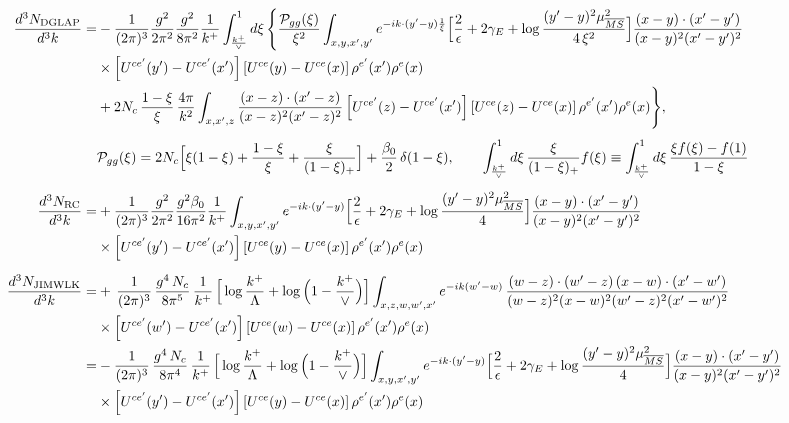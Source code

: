 \documentclass[9pt]{article}
\numberwithin{equation}{section}
\begin{document}
\begin{align}
\frac{d^{3}N_{\rm DGLAP}}{d^{3}k}= &-\frac{1}{(2\pi)^{3}}\frac{g^{2}}{2\pi^{2}}\frac{g^{2}}{8\pi^{2}}\frac{1}{k^{+}}\int_{\frac{k^{+}}{\vee}}^{1}d\xi\,\Bigg\{\frac{\mathcal P_{gg}(\xi)}{\xi^{2}}\int_{x,y,x',y'}e^{-ik\cdot(y'-y)\frac{1}{\xi}}\Big[\frac{2}{\epsilon}+2\gamma_{E}+\log\frac{(y'-y)^{2}\mu^{2}_{\overline{MS}}}{4\,\xi^{2}}\Big]\frac{(x-y)\cdot(x'-y')}{(x-y)^{2}(x'-y')^{2}}\notag\\
&\times\left[U^{ce'}(y') - U^{ce'}(x')\right]\left[U^{ce}(y) - U^{ce}(x)\right]\rho^{e'}(x')\rho^{e}(x)\notag\\
&+2N_{c}\,\frac{1-\xi}{\xi}\,\frac{4\pi}{k^{2}}\int_{x,x',z}\frac{(x-z)\cdot(x'-z)}{(x-z)^{2}(x'-z)^{2}}\left[U^{ce'}(z) - U^{ce'}(x')\right]\left[U^{ce}(z) - U^{ce}(x)\right]\rho^{e'}(x')\rho^{e}(x)\Bigg\},\\[4pt]
&\mathcal P_{gg}(\xi)=2N_{c}\Big[\xi(1-\xi)+\frac{1-\xi}{\xi}+\frac{\xi}{(1-\xi)_{+}}\Big]+\frac{\beta_{0}}{2}\,\delta(1-\xi),\qquad
\int_{\frac{k^{+}}{\vee}}^{1}d\xi\,\frac{\xi}{(1-\xi)_{+}}f(\xi)\equiv\int_{\frac{k^{+}}{\vee}}^{1}d\xi\,\frac{\xi f(\xi)-f(1)}{1-\xi}\notag\\[6pt]
\frac{d^{3}N_{\rm RC}}{d^{3}k}= & +\frac{1}{(2\pi)^{3}}\frac{g^{2}}{2\pi^{2}}\frac{g^{2}\beta_{0}}{16\pi^{2}}\frac{1}{k^{+}}\int_{x,y,x',y'}e^{-ik\cdot(y'-y)}\Big[\frac{2}{\epsilon}+2\gamma_{E}+\log\frac{(y'-y)^{2}\mu^{2}_{\overline{MS}}}{4}\Big]\frac{(x-y)\cdot(x'-y')}{(x-y)^{2}(x'-y')^{2}}\notag\\
&\times\left[U^{ce'}(y') - U^{ce'}(x')\right]\left[U^{ce}(y) - U^{ce}(x)\right]\rho^{e'}(x')\rho^{e}(x)\\[6pt]
\frac{d^{3}N_{\rm JIMWLK}}{d^{3}k}= & +\,\frac{1}{(2\pi)^{3}}\,\frac{g^{4}\,N_{c}}{8\pi^{5}}\,\frac{1}{k^{+}}\,\Big[\log\frac{k^{+}}{\Lambda}+\log\Big(1-\frac{k^{+}}{\vee}\Big)\Big]\int_{x,z,w,w',x'}e^{-ik(w'-w)}\,\frac{(w-z)\cdot (w'-z)\,(x-w)\cdot (x'-w')}{(w-z)^{2}(x-w)^{2}(w'-z)^{2}(x'-w')^{2}}\notag\\
&\times\left[U^{ce'}(w') - U^{ce'}(x')\right]\left[U^{ce}(w) - U^{ce}(x)\right]\rho^{e'}(x') \rho^{e}(x)\notag \\
= & -\frac{1}{(2\pi)^{3}}\,\frac{g^{4}\,N_{c}}{8\pi^{4}}\,\frac{1}{k^{+}}\,\Big[\log\frac{k^{+}}{\Lambda}+\log\Big(1-\frac{k^{+}}{\vee}\Big)\Big]\int_{x,y,x',y'}e^{-ik\cdot(y'-y)}\Big[\frac{2}{\epsilon}+2\gamma_{E}+\log\frac{(y'-y)^{2}\mu^{2}_{\overline{MS}}}{4}\Big]\frac{(x-y)\cdot(x'-y')}{(x-y)^{2}(x'-y')^{2}}\notag\\
&\times\left[U^{ce'}(y') - U^{ce'}(x')\right]\left[U^{ce}(y) - U^{ce}(x)\right]\rho^{e'}(x')\rho^{e}(x)\\[6pt]

\end{align}
\end{document}
